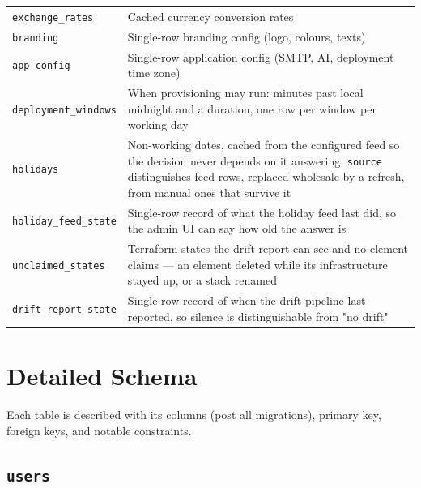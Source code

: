 \documentclass[12pt,a4paper,twoside]{report}
\newcommand{\code}[1]{\texttt{#1}}
\begin{document}
\begin{table}[H]
\begin{tabular}{@{}lp{9cm}@{}}
    \code{exchange\_rates}          & Cached currency conversion rates \\
    \code{branding}                 & Single-row branding config (logo, colours, texts) \\
    \code{app\_config}              & Single-row application config (SMTP, AI, deployment time zone) \\
    \code{deployment\_windows}      & When provisioning may run: minutes past local midnight and a duration, one row per window per working day \\
    \code{holidays}                 & Non-working dates, cached from the configured feed so the decision never depends on it answering. \code{source} distinguishes feed rows, replaced wholesale by a refresh, from manual ones that survive it \\
    \code{holiday\_feed\_state}     & Single-row record of what the holiday feed last did, so the admin UI can say how old the answer is \\
    \code{unclaimed\_states}        & Terraform states the drift report can see and no element claims — an element deleted while its infrastructure stayed up, or a stack renamed \\
    \code{drift\_report\_state}     & Single-row record of when the drift pipeline last reported, so silence is distinguishable from "no drift" \\
    \bottomrule
  \end{tabular}
\end{table}

\section{Detailed Schema}
\label{sec:schema-detail}

Each table is described with its columns (post all migrations), primary
key, foreign keys, and notable constraints.

\subsection*{\texttt{users}}
\end{document}
